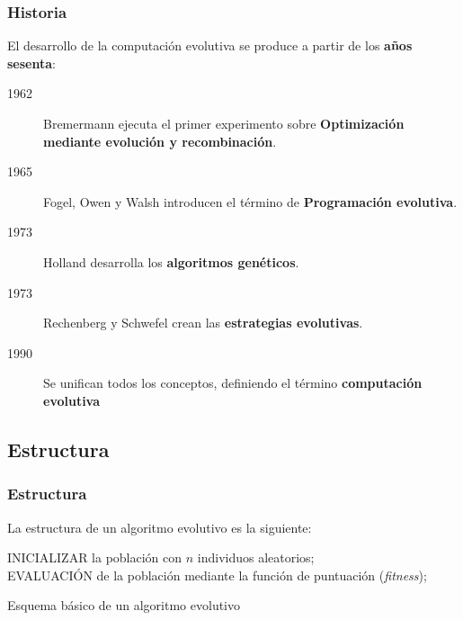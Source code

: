 \documentclass{beamer}
\begin{document}
\begin{frame}
\frametitle{Historia}

El desarrollo de la computación evolutiva se produce a partir de los \textbf{años sesenta}:

\begin{description}
    \item[1962] Bremermann ejecuta el primer experimento sobre \textbf{Optimización mediante evolución y recombinación}.
    \item[1965] Fogel, Owen y Walsh introducen el término de \textbf{Programación evolutiva}.
    \item[1973] Holland desarrolla los \textbf{algoritmos genéticos}.
    \item[1973] Rechenberg y Schwefel crean las \textbf{estrategias evolutivas}.
    \item[1990] Se unifican todos los conceptos, definiendo el término \textbf{computación evolutiva}
\end{description}

\end{frame}

\subsection{Estructura}

\begin{frame}
\frametitle{Estructura}

La estructura de un algoritmo evolutivo es la siguiente:

\begin{algorithm}[H]
 INICIALIZAR la población con $n$ individuos aleatorios;\\
 EVALUACIÓN de la población mediante la función de puntuación (\textit{fitness});
 
 \caption{Esquema básico de un algoritmo evolutivo}
\end{algorithm}

\end{frame}
\end{document}
